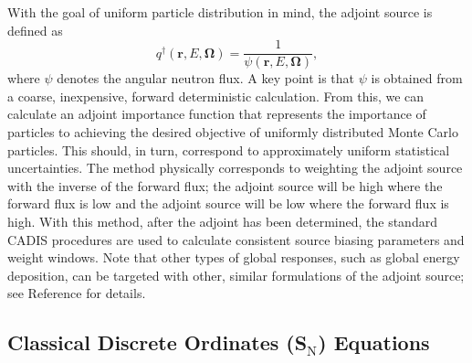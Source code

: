 \documentclass{article} %
\newcommand{\bo}{\mathbf\Omega}
\newcommand{\vecr}{\textbf{r}}
\newcommand{\sn}{S$_\mathrm{N}$}
\begin{document}
With the goal of uniform particle distribution in mind, the adjoint source is
defined as
%
\begin{equation}
q^{\dagger}(\vecr,E,\bo) = \frac{1}{\psi(\vecr,E,\bo)},
\end{equation}
%
where $\psi$ denotes the angular neutron flux. A key point is that $\psi$ is obtained
from a coarse, inexpensive, forward deterministic calculation. From this, we
can calculate an adjoint importance function that represents the importance of
particles to achieving the desired objective of uniformly distributed Monte
Carlo particles. This should, in turn, correspond to approximately uniform
statistical uncertainties. The method physically corresponds to weighting the
adjoint source with the inverse of the forward flux; the adjoint source will
be high where the forward flux is low and the adjoint source will be low where
the forward flux is high. With this method, after the adjoint has been
determined, the standard CADIS procedures are used to calculate consistent
source biasing parameters and weight windows. Note that other types of global
responses, such as global energy deposition, can be targeted with other,
similar formulations of the adjoint source; see Reference \cite{fwcadis} for details. 

\subsection{Classical Discrete Ordinates (\sn) Equations}
\end{document}
